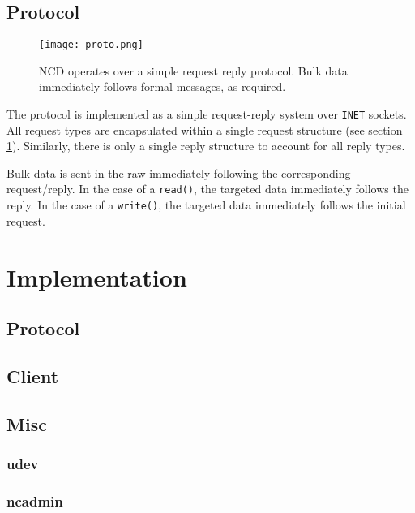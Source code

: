 \documentclass[11pt,twocolumn]{article}
\begin{document}
\subsection{Protocol}

\begin{figure}[h]
  \begin{center}
    \texttt{[image: proto.png]}
  \end{center}
  \caption{NCD operates over a simple request reply protocol. Bulk data
  immediately follows formal messages, as required.}
  \label{fig:protocol}
\end{figure}

The protocol is implemented as a simple request-reply system over
\texttt{INET} sockets. All request types are encapsulated within a
single request structure (see section \ref{sec:implementation}).
Similarly, there is only a single reply structure to account for all
reply types.

Bulk data is sent in the raw immediately following the corresponding
request/reply. In the case of a \texttt{read()}, the targeted data
immediately follows the reply. In the case of a \texttt{write()}, the
targeted data immediately follows the initial request.

\section{Implementation}
\label{sec:implementation}

\subsection{Protocol}

\subsection{Client}

\subsection{Misc}

\subsubsection{udev}

\subsubsection{ncadmin}
\end{document}
